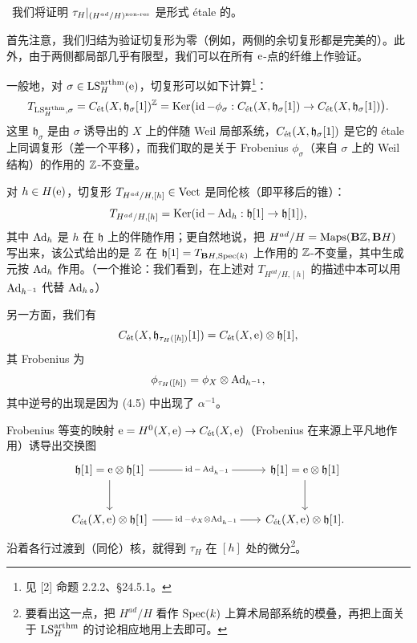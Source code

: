 \ 我们将证明 $\tau_H|_{(H^{ad}/H)^{\nonres}}$ 是形式 étale 的。

首先注意，我们归结为验证切复形为零（例如，两侧的余切复形都是完美的）。此外，由于两侧都局部几乎有限型，我们可以在所有 $\e$-点的纤维上作验证。

一般地，对 $\sigma \in \LS^{\arthm}_H(\e)$，切复形可以如下计算\footnote{见 [2] 命题 2.2.2、§24.5.1。}：
\[
  T_{\LS^{\arthm}_H,\sigma} = C_{\et}(X,\mathfrak{h}_\sigma[1])^{\ZZ} = \mathrm{Ker}\bigl(\id - \phi_\sigma : C_{\et}(X,\mathfrak{h}_\sigma[1]) \to C_{\et}(X,\mathfrak{h}_\sigma[1])\bigr).
\]
这里 $\mathfrak{h}_\sigma$ 是由 $\sigma$ 诱导出的 $X$ 上的伴随 Weil 局部系统，$C_{\et}(X,\mathfrak{h}_\sigma[1])$ 是它的 étale 上同调复形（差一个平移），而我们取的是关于 Frobenius $\phi_\sigma$（来自 $\sigma$ 上的 Weil 结构）的作用的 $\ZZ$-不变量。

对 $h \in H(\e)$，切复形 $T_{H^{ad}/H,[h]} \in \Vect$ 是同伦核（即平移后的锥）：
\[
  T_{H^{ad}/H,[h]} = \mathrm{Ker}(\id - \Ad_h : \mathfrak{h}[1] \to \mathfrak{h}[1]),
\]
其中 $\Ad_h$ 是 $h$ 在 $\mathfrak{h}$ 上的伴随作用；更自然地说，把 $H^{ad}/H = \mathrm{Maps}(\mathbf{B}\ZZ,\mathbf{B}H)$ 写出来，该公式给出的是 $\ZZ$ 在 $\mathfrak{h}[1] = T_{\mathbf{B}H,\Spec(k)}$ 上作用的 $\ZZ$-不变量，其中生成元按 $\Ad_h$ 作用。（一个推论：我们看到，在上述对 $T_{H^{ad}/H,[h]}$ 的描述中本可以用 $\Ad_{h^{-1}}$ 代替 $\Ad_h$。）

另一方面，我们有
\[
  C_{\et}(X,\mathfrak{h}_{\tau_H([h])}[1]) = C_{\et}(X,\e) \otimes \mathfrak{h}[1],
\]
其 Frobenius 为
\[
  \phi_{\tau_H([h])} = \phi_X \otimes \Ad_{h^{-1}},
\]
其中逆号的出现是因为 (4.5) 中出现了 $\alpha^{-1}$。

Frobenius 等变的映射 $\e = H^0(X,\e) \to C_{\et}(X,\e)$（Frobenius 在来源上平凡地作用）诱导出交换图
\[
\begin{tikzcd}[column sep=3.4cm, row sep=large]
  \mathfrak{h}[1] = \e \otimes \mathfrak{h}[1] \arrow[r, "{\id - \Ad_{h^{-1}}}" description] \arrow[d]
    & \mathfrak{h}[1] = \e \otimes \mathfrak{h}[1] \arrow[d] \\
  C_{\et}(X,\e) \otimes \mathfrak{h}[1] \arrow[r, "{\id - \phi_X \otimes \Ad_{h^{-1}}}" description]
    & C_{\et}(X,\e) \otimes \mathfrak{h}[1].
\end{tikzcd}
\]
沿着各行过渡到（同伦）核，就得到 $\tau_H$ 在 $[h]$ 处的微分\footnote{要看出这一点，把 $H^{ad}/H$ 看作 $\Spec(k)$ 上算术局部系统的模叠，再把上面关于 $\LS^{\arthm}_H$ 的讨论相应地用上去即可。}。

